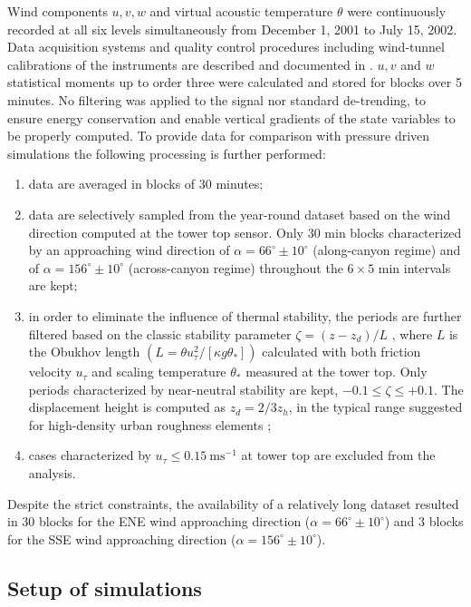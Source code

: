 Wind components $u,v,w$ and virtual acoustic temperature $\theta$ were continuously recorded at all six levels simultaneously from December 1, 2001 to July 15, 2002.
Data acquisition systems and quality control procedures including wind-tunnel calibrations of the instruments are described and documented in \cite{Christen2005}.
$u,v$ and $w$ statistical moments up to order three were calculated and stored for blocks over 5 minutes. No filtering was applied to the signal nor standard de-trending, to ensure energy conservation and enable vertical gradients of the state variables to be properly computed. 
To provide data for comparison with pressure driven simulations the following processing is further performed:
%
\begin{enumerate}
	\item data are averaged in blocks of 30 minutes;
	\item data are selectively sampled from the year-round dataset based on the wind direction computed at the tower top sensor. Only $30$ min blocks characterized by an approaching wind direction of $\alpha =  66^{\circ} \pm 10^{\circ}$ (along-canyon regime) and of $\alpha = 156^{\circ} \pm 10^{\circ}$ (across-canyon regime) throughout the $6 \times 5$ min intervals are kept;
	\item in order to eliminate the influence of thermal stability, the periods are further filtered based on the classic stability parameter $\zeta = (z - z_d)/L$ \citep{Stull1988}, where $L$ is the Obukhov length $(L = \theta u^2_{\tau} / [\kappa g \theta_*])$ calculated with both friction velocity $u_{\tau}$ and scaling temperature $\theta_*$ measured at the tower top. Only periods characterized by near-neutral stability are kept, $-0.1 \le \zeta \le +0.1$. The displacement height is computed as $z_d=2/3 z_h$, in the typical range suggested for high-density urban roughness elements \citep{Grimmond1999};
	\item cases characterized by $u_{\tau} \le 0.15 \ \mathrm{ms^{-1}}$ at tower top are excluded from the analysis.
\end{enumerate}
%
Despite the strict constraints, the availability of a relatively long dataset resulted in $30$ blocks for the ENE wind approaching direction ($\alpha =  66^{\circ} \pm 10^{\circ}$) and $3$ blocks for the SSE wind approaching direction ($\alpha =  156^{\circ} \pm 10^{\circ}$).


\subsection{Setup of simulations}

